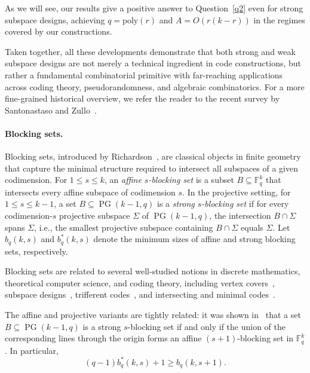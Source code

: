 \documentclass[11pt]{article}
\newcommand{\F}{\mathbb{F}}
\newcommand{\poly}{\mathrm{poly}}
\DeclareMathOperator{\PG}{PG}
\begin{document}
As we will see, our results give a positive answer to Question~\ref{q2} even for strong subspace designs, achieving $q=\poly(r)$ and $A=O(r(k-r))$ in the regimes covered by our constructions.

Taken together, all these developments demonstrate that both strong and weak subspace designs are not merely a technical ingredient in code constructions, but rather a fundamental combinatorial primitive with far-reaching applications across coding theory, pseudorandomness, and algebraic combinatorics.
For a more fine-grained historical overview, we refer the reader to the recent survey by Santonastaso and Zullo~\cite{santonastaso2023subspace}.


\paragraph{Blocking sets.} Blocking sets, introduced by Richardson~\cite{Ric56}, are classical objects in finite geometry that capture the minimal structure required to intersect all subspaces of a given codimension. For $1 \le s \le k$, an \emph{affine $s$-blocking set} is a subset $B \subseteq \F_q^k$ that intersects every affine subspace of codimension $s$. In the projective setting, for $1 \le s \le k-1$, a set $B \subseteq \PG(k-1,q)$ is a \emph{strong $s$-blocking set} if for every codimension-$s$ projective subspace $\Sigma$ of $\PG(k-1,q)$, the intersection $B \cap \Sigma$ spans $\Sigma$, i.e., the smallest projective subspace containing $B\cap\Sigma$ equals $\Sigma$. Let $b_q(k,s)$ and $b_q^*(k,s)$ denote the minimum sizes of affine and strong blocking sets, respectively.

Blocking sets are related to several well-studied notions in discrete mathematics, theoretical computer science, and coding theory, including vertex covers~\cite{Fur88}, subspace designs~\cite{FZ16,guruswami2016explicit}, trifferent codes~\cite{BDGP24}, and intersecting and minimal codes~\cite{CL85,ABN22,TQLZ21,XKH25}.

The affine and projective variants are tightly related: it was shown in~\cite{BDGP24} that a set $B \subseteq \PG(k-1,q)$ is a strong $s$-blocking set if and only if the union of the corresponding lines through the origin forms an affine $(s+1)$-blocking set in $\F_q^k$. In particular,
\begin{equation}\label{eq:strong-affine-connection}
    (q-1) b_q^*(k,s) +1 \ge b_q(k,s+1).
\end{equation}
\end{document}
